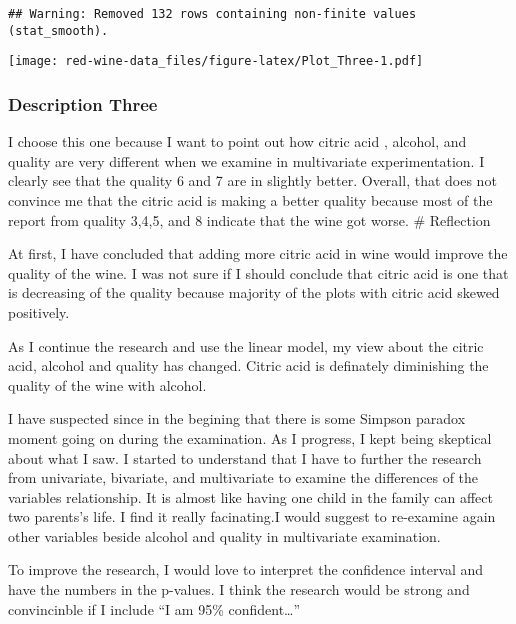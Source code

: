 \documentclass[]{article}
\begin{document}
\begin{verbatim}
## Warning: Removed 132 rows containing non-finite values (stat_smooth).
\end{verbatim}

\texttt{[image: red-wine-data\_files/figure-latex/Plot\_Three-1.pdf]}

\subsubsection{Description Three}\label{description-three}

I choose this one because I want to point out how citric acid , alcohol,
and quality are very different when we examine in multivariate
experimentation. I clearly see that the quality 6 and 7 are in slightly
better. Overall, that does not convince me that the citric acid is
making a better quality because most of the report from quality 3,4,5,
and 8 indicate that the wine got worse. \# Reflection

At first, I have concluded that adding more citric acid in wine would
improve the quality of the wine. I was not sure if I should conclude
that citric acid is one that is decreasing of the quality because
majority of the plots with citric acid skewed positively.

As I continue the research and use the linear model, my view about the
citric acid, alcohol and quality has changed. Citric acid is definately
diminishing the quality of the wine with alcohol.

I have suspected since in the begining that there is some Simpson
paradox moment going on during the examination. As I progress, I kept
being skeptical about what I saw. I started to understand that I have to
further the research from univariate, bivariate, and multivariate to
examine the differences of the variables relationship. It is almost like
having one child in the family can affect two parents's life. I find it
really facinating.I would suggest to re-examine again other variables
beside alcohol and quality in multivariate examination.

To improve the research, I would love to interpret the confidence
interval and have the numbers in the p-values. I think the research
would be strong and convincinble if I include ``I am 95\%
confident\ldots{}''
\end{document}
